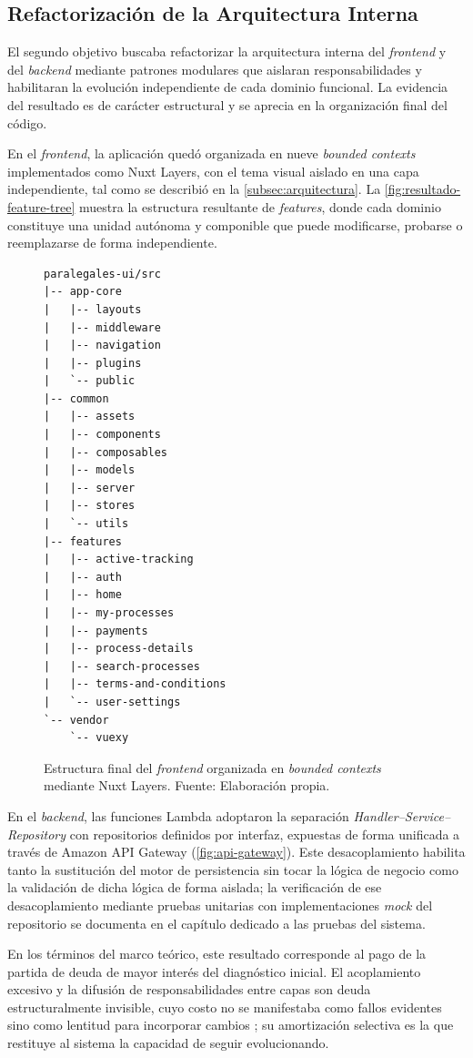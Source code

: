 \subsection{Refactorización de la Arquitectura Interna}\label{subsec:resultado-b}

El segundo objetivo buscaba refactorizar la arquitectura interna del \textit{frontend} y del \textit{backend} mediante patrones modulares que aislaran responsabilidades y habilitaran la evolución independiente de cada dominio funcional. La evidencia del resultado es de carácter estructural y se aprecia en la organización final del código.

En el \textit{frontend}, la aplicación quedó organizada en nueve \textit{bounded contexts} implementados como Nuxt Layers, con el tema visual aislado en una capa independiente, tal como se describió en la \autoref{subsec:arquitectura}. La \autoref{fig:resultado-feature-tree} muestra la estructura resultante de \textit{features}, donde cada dominio constituye una unidad autónoma y componible que puede modificarse, probarse o reemplazarse de forma independiente.

\newcommand\resultadoFeatureTreeCaption{Estructura final del \textit{frontend} organizada en \textit{bounded contexts} mediante Nuxt Layers. \hspace{1em}}
\begin{figure}[H]
  \centering
  \begin{verbatim}
paralegales-ui/src
|-- app-core
|   |-- layouts
|   |-- middleware
|   |-- navigation
|   |-- plugins
|   `-- public
|-- common
|   |-- assets
|   |-- components
|   |-- composables
|   |-- models
|   |-- server
|   |-- stores
|   `-- utils
|-- features
|   |-- active-tracking
|   |-- auth
|   |-- home
|   |-- my-processes
|   |-- payments
|   |-- process-details
|   |-- search-processes
|   |-- terms-and-conditions
|   `-- user-settings
`-- vendor
    `-- vuexy
  \end{verbatim}
  \caption[\resultadoFeatureTreeCaption]{\resultadoFeatureTreeCaption Fuente: Elaboración propia.}
  \label{fig:resultado-feature-tree}
\end{figure}

En el \textit{backend}, las funciones Lambda adoptaron la separación \textit{Handler--Service--Repository} con repositorios definidos por interfaz, expuestas de forma unificada a través de Amazon API Gateway (\autoref{fig:api-gateway}). Este desacoplamiento habilita tanto la sustitución del motor de persistencia sin tocar la lógica de negocio como la validación de dicha lógica de forma aislada; la verificación de ese desacoplamiento mediante pruebas unitarias con implementaciones \textit{mock} del repositorio se documenta en el capítulo dedicado a las pruebas del sistema.

En los términos del marco teórico, este resultado corresponde al pago de la partida de deuda de mayor interés del diagnóstico inicial. El acoplamiento excesivo y la difusión de responsabilidades entre capas son deuda estructuralmente invisible, cuyo costo no se manifestaba como fallos evidentes sino como lentitud para incorporar cambios \cite{Kruchten2012}; su amortización selectiva es la que restituye al sistema la capacidad de seguir evolucionando.
